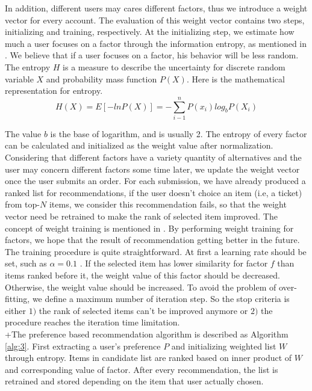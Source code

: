 \documentclass{llncs}
\begin{document}
In addition, different users may cares different factors, thus we introduce a weight vector for every account. The evaluation of this weight vector contains two steps, initializing and training, respectively. At the initializing step, we estimate how much a user focuses on a factor through the information entropy, as mentioned in \cite{yang:pers}. We believe that if a user focuses on a factor, his behavior will be less random. The entropy $H$ is a measure to describe the uncertainty for discrete random variable $X$ and probability mass function $P(X)$. Here is the mathematical representation for entropy.\\
\begin{equation}
H(X)=E[-lnP(X)]= - \sum_{i-1}^n P(x_i)log_bP(X_i)
\end{equation}\par
The value $b$ is the base of logarithm, and is usually 2. The entropy of every factor can be calculated and initialized as the weight value after normalization. Considering that different factors have a variety quantity of alternatives and the user may concern different factors some time later, we update the weight vector once the user submits an order. For each submission, we have already produced a ranked list for recommendations, if the user doesn't choice an item (i.e, a ticket) from top-$N$ items, we consider this recommendation fails, so that the weight vector need be retrained to make the rank of selected item improved. The concept of weight training is mentioned in \cite{lor:flight}. By performing weight training for factors, we hope that the result of recommendation getting better in the future. The training procedure is quite straightforward. At first a learning rate should be set, such as $\alpha = 0.1$ . If the selected item has lower similarity for factor $f$ than items ranked before it, the weight value of this factor should be decreased. Otherwise, the weight value should be increased. To avoid the problem of over-fitting, we define a maximum number of iteration step. So the stop criteria is either $1)$ the rank of selected items can't be improved anymore or $2)$ the procedure reaches the iteration time limitation.\\
 +The preference based recommendation algorithm is described as Algorithm \ref{alg:3}. First extracting a user's preference  $P$ and initializing weighted list $W$ through entropy. Items in candidate list are ranked based on inner product of $W$ and corresponding value of factor. After every recommendation, the list is retrained and stored depending on the item that user actually chosen.
\end{document}
